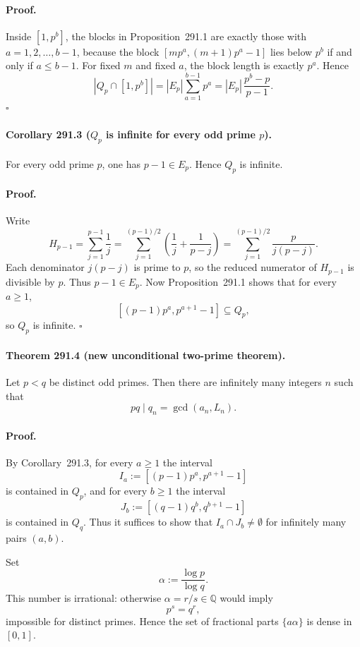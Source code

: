 \paragraph{Proof.}
Inside $[1,p^b]$, the blocks in Proposition~291.1 are exactly those with $a=1,2,\dots,b-1$, because the block $[mp^a,(m+1)p^a-1]$ lies below $p^b$ if and only if $a\le b-1$.
For fixed $m$ and fixed $a$, the block length is exactly $p^a$. Hence
\[
|Q_p\cap[1,p^b]|
=|E_p|\sum_{a=1}^{b-1}p^a
=|E_p|\,\frac{p^b-p}{p-1}.
\]
\hfill$\square$

\paragraph{Corollary 291.3 ($Q_p$ is infinite for every odd prime $p$).}
For every odd prime $p$, one has $p-1\in E_p$. Hence $Q_p$ is infinite.

\paragraph{Proof.}
Write
\[
H_{p-1}=\sum_{j=1}^{p-1}\frac1j
=\sum_{j=1}^{(p-1)/2}\left(\frac1j+\frac1{p-j}\right)
=\sum_{j=1}^{(p-1)/2}\frac{p}{j(p-j)}.
\]
Each denominator $j(p-j)$ is prime to $p$, so the reduced numerator of $H_{p-1}$ is divisible by $p$.
Thus $p-1\in E_p$.
Now Proposition~291.1 shows that for every $a\ge 1$,
\[
[(p-1)p^a,p^{a+1}-1]\subseteq Q_p,
\]
so $Q_p$ is infinite. \hfill$\square$

\paragraph{Theorem 291.4 (new unconditional two-prime theorem).}
Let $p<q$ be distinct odd primes. Then there are infinitely many integers $n$ such that
\[
pq\mid q_n=\gcd(a_n,L_n).
\]

\paragraph{Proof.}
By Corollary~291.3, for every $a\ge 1$ the interval
\[
I_a:=[(p-1)p^a,p^{a+1}-1]
\]
is contained in $Q_p$, and for every $b\ge 1$ the interval
\[
J_b:=[(q-1)q^b,q^{b+1}-1]
\]
is contained in $Q_q$.
Thus it suffices to show that $I_a\cap J_b\neq\emptyset$ for infinitely many pairs $(a,b)$.

Set
\[
\alpha:=\frac{\log p}{\log q}.
\]
This number is irrational: otherwise $\alpha=r/s\in\mathbb Q$ would imply
\[
p^s=q^r,
\]
impossible for distinct primes.
Hence the set of fractional parts $\{a\alpha\}$ is dense in $[0,1]$.

